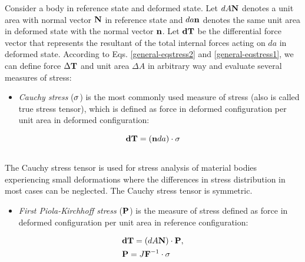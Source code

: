 \documentclass[letterpaper,10pt,english]{sphinxmanual}
\begin{document}
Consider a body in reference state and deformed state. Let $dA{\bf N}$ denotes a unit area with normal vector ${\bf N}$ in reference state and $da{\bf n}$ denotes the same unit area in deformed state with the normal vector ${\bf n}$. Let ${\bf dT}$ be the differential force vector that represents the resultant of the total internal forces acting on $da$ in deformed state. According to Eqs. \eqref{general-eqstress2} and \eqref{general-eqstress1}, we can define force $\Delta {\bf T}$ and unit area $\Delta A$ in arbitrary way and evaluate several measures of stress:
\begin{itemize}
\item {} 
\emph{Cauchy stress} (${\bf \sigma}$) is the most commonly used measure of stress (also is called true stress tensor), which is defined as force in deformed configuration per unit area in deformed configuration:

\end{itemize}
\label{general:equation-eqstress4}\begin{gather}
\begin{split}{\bf dT} = ({\bf n}da) \cdot {\bf \sigma}\end{split}\label{general-eqstress4}\\\begin{split}\end{split}\notag
\end{gather}
The Cauchy stress tensor is used for stress analysis of material bodies experiencing small deformations where the differences in stress distribution in most cases can be neglected. The Cauchy stress tensor is symmetric.
\begin{itemize}
\item {} 
\emph{First Piola-Kirchhoff stress} (${\bf P}$) is the measure of stress defined as force in deformed configuration per unit area in reference configuration:

\end{itemize}
\label{general:equation-eq:eqstress5}\begin{gather}
\begin{split}\begin{split}
&{\bf dT} = (dA{\bf N}) \cdot {\bf P},\\
&{\bf P} = J {\bf F}^{-1} \cdot {\bf \sigma}
\end{split}\end{split}\label{general-eq:eqstress5}\\\begin{split}\end{split}\notag
\end{gather}
\end{document}
